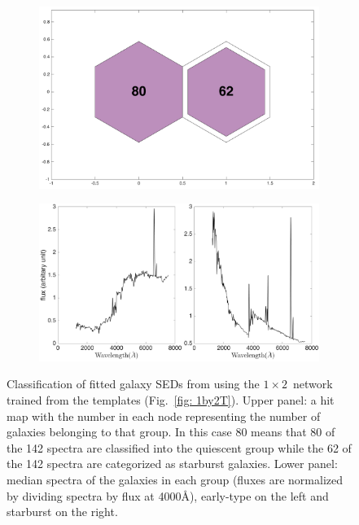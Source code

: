             \begin{figure}
                \begin{subfigure}[b]{\textwidth}
                    \centering
                    \includegraphics[width=\textwidth]{../image_paper2/1d/hit_v_1_by_2.png}
                \end{subfigure}
                \hfill
                \begin{subfigure}[b]{\textwidth}
                     \includegraphics[width=\textwidth]{../image_paper2/1d/SED_total1by2.png}
                \end{subfigure}
                \caption[Classification of fitted galaxy SEDs from \citet{Hossein12} using the $1\times2$~networks]{Classification of fitted galaxy SEDs from \citet{Hossein12} using the $1\times2$~network trained from the \citet{Kinney96} templates (Fig.~\ref{fig: 1by2T}). Upper panel: a hit map with the number in each node representing the number of galaxies belonging to that group. In this case 80 means that 80 of the 142 spectra are classified into the quiescent group while the 62 of the 142 spectra are categorized as starburst galaxies. Lower panel: median spectra of the galaxies in each group (fluxes are normalized by dividing spectra by flux at 4000\AA), early-type on the left and starburst on the right.}
                \label{fig: 1by2V}
            \end{figure}          
            

